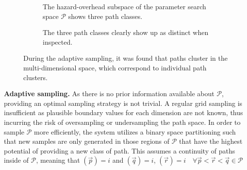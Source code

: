 \begin{figure}
\centering
\begin{subfigure}[b]{0.4\textwidth}
    \caption{The hazard-overhead subspace of the parameter search space $\mathcal{P}$ shows three path classes.}
    \label{contributions:usar:adaptive:space}
\end{subfigure}
\hspace*{1cm}
\begin{subfigure}[b]{0.3\textwidth}
    \caption{The three path classes clearly show up as distinct when inspected.}
    \label{contributions:usar:adaptive:rendering}
\end{subfigure}
\caption{During the adaptive sampling, it was found that paths cluster in the multi-dimensional space, which correspond to individual path clusters.}
\label{contributions:usar:adaptive}
\end{figure}

\textbf{Adaptive sampling.}  As there is no prior information available about $\mathcal{P}$, providing an optimal sampling strategy is not trivial.  A regular grid sampling is insufficient as plausible boundary values for each dimension are not known, thus incurring the risk of oversampling or undersampling the path space.  In order to sample $\mathcal{P}$ more efficiently, the system utilizes a binary space partitioning such that new samples are only generated in those regions of $\mathcal{P}$ that have the highest potential of providing a new class of path.  This assumes a continuity of paths inside of $\mathcal{P}$, meaning that \astar $\left( \vec{p} \right) = i$ and \astar $\left( \vec{q} \right) = i$, \astar $\left( \vec{r} \right) = i \quad \forall \vec{p} < \vec{r} < \vec{q} \in \mathcal{P}$

